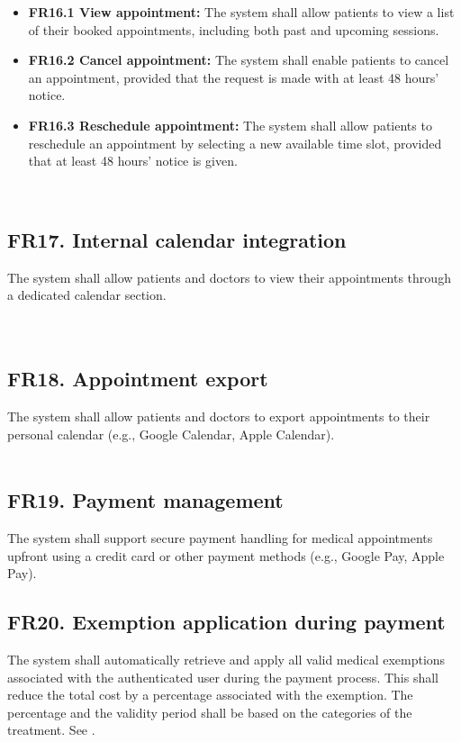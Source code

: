 \documentclass[12pt, a4paper]{article}
\begin{document}
\begin{itemize}
    \item \textbf{FR16.1 View appointment:} The system shall allow patients to view a list of their booked appointments, including both past and upcoming sessions.
    \item \textbf{FR16.2 Cancel appointment:} The system shall enable patients to cancel an appointment, provided that the request is made with at least 48 hours' notice.
    \item \textbf{FR16.3 Reschedule appointment:} The system shall allow patients to reschedule an appointment by selecting a new available time slot, provided that at least 48 hours' notice is given.
\end{itemize}
 \\

\subsection{FR17. Internal calendar integration} \label{FR17}
The system shall allow patients and doctors to view their appointments through a dedicated calendar section.
\\ 
\\ 
\\ 

\subsection{FR18. Appointment export} \label{FR18}
The system shall allow patients and doctors to export appointments to their personal calendar (e.g., Google Calendar, Apple Calendar).
\\ 
\\ 

\subsection{FR19. Payment management} \label{FR19}
The system shall support secure payment handling for medical appointments upfront using a credit card or other payment methods (e.g., Google Pay, Apple Pay).
\\ 

\subsection{FR20. Exemption application during payment} \label{FR20}
The system shall automatically retrieve and apply all valid medical exemptions associated with the authenticated user during the payment process. This shall reduce the total cost by a percentage associated with the exemption. The percentage and the validity period shall be based on the categories of the treatment. See .
\\ 
\\ 
\end{document}
